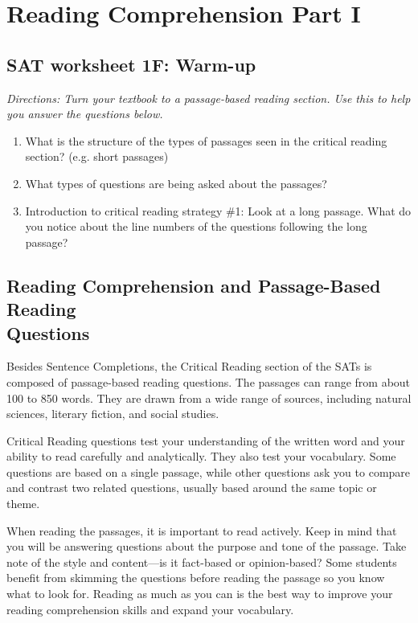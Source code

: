 \chapter[Reading Comprehension]{Reading Comprehension Part I}
\section{SAT worksheet 1F: Warm-up}
\textit{Directions: Turn your textbook to a passage-based reading section. Use this to help you answer the questions below.}

\begin{enumerate}
\item What is the structure of the types of passages seen in the critical reading section? (e.g. short passages)
\vfill\item What types of questions are being asked about the passages?
\vfill\item Introduction to critical reading strategy \#1: Look at a long passage. What do you notice about the line numbers of the questions following the long passage?
\end{enumerate}

\vfill
\newpage
\section[Reading Questions]{Reading Comprehension and Passage-Based Reading\\ Questions}
Besides Sentence Completions, the Critical Reading section of the SATs is composed of passage-based reading questions.  The passages can range from about 100 to 850 words.  They are drawn from a wide range of sources, including natural sciences, literary fiction, and social studies.  

\bigskip
Critical Reading questions test your understanding of the written word and your ability to read carefully and analytically.  They also test your vocabulary.  Some questions are based on a single passage, while other questions ask you to compare and contrast two related questions, usually based around the same topic or theme.

\bigskip
When reading the passages, it is important to read actively.  Keep in mind that you will be answering questions about the purpose and tone of the passage.  Take note of the style and content—is it fact-based or opinion-based?  Some students benefit from skimming the questions before reading the passage so you know what to look for. Reading as much as you can is the best way to improve your reading comprehension skills and expand your vocabulary.

